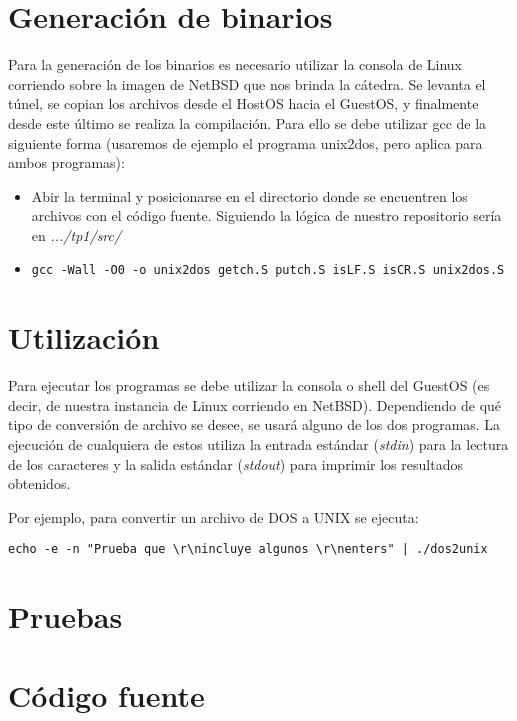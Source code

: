 \documentclass[a4paper,11pt]{article}
\begin{document}
\section{Generaci\'on de binarios}
Para la generaci\'on de los binarios es necesario utilizar la consola de Linux corriendo sobre la imagen de NetBSD que nos brinda la cátedra. Se levanta el túnel, se copian los archivos desde el HostOS hacia el GuestOS, y finalmente desde este último se realiza la compilación. Para ello se debe utilizar gcc de la siguiente forma (usaremos de ejemplo el programa unix2dos, pero aplica para ambos programas):

\begin{itemize}
\item Abir la terminal y posicionarse en el directorio donde se encuentren los archivos con el c\'odigo fuente. Siguiendo la lógica de nuestro repositorio sería en \textit{.../tp1/src/}
\item \begin{verbatim}
gcc -Wall -O0 -o unix2dos getch.S putch.S isLF.S isCR.S unix2dos.S
\end{verbatim} 
\end{itemize}

\section{Utilización}
Para ejecutar los programas se debe utilizar la consola o shell del GuestOS (es decir, de nuestra instancia de Linux corriendo en NetBSD). Dependiendo de qué tipo de conversión de archivo se desee, se usará alguno de los dos programas. La ejecución de cualquiera de estos utiliza la entrada estándar (\textit{stdin}) para la lectura de los caracteres y la salida estándar (\textit{stdout}) para imprimir los resultados obtenidos.

\indent	
Por ejemplo, para convertir un archivo de DOS a UNIX se ejecuta: 

\begin{verbatim}
echo -e -n "Prueba que \r\nincluye algunos \r\nenters" | ./dos2unix 
\end{verbatim}

\section{Pruebas}

\section{C\'odigo fuente}
\end{document}
